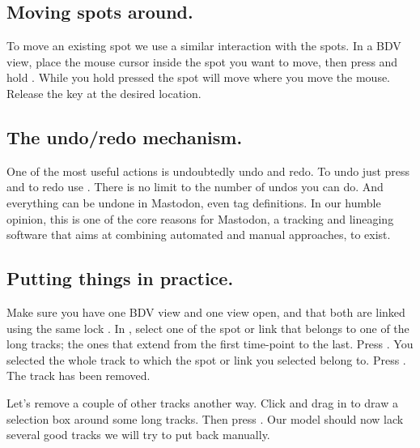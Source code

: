 \subsection{Moving spots around.}

To move an existing spot we use a similar interaction with the spots.
In a BDV view, place the mouse cursor inside the spot you want to move, then press and hold .
While you hold  pressed the spot will move where you move the mouse. 
Release the  key at the desired location.


\subsection{The undo/redo mechanism.}

One of the most useful actions is undoubtedly undo and redo. 
To undo just press  and to redo use . 
There is no limit to the number of undos you can do. 
And everything can be undone in Mastodon, even tag definitions.
In our humble opinion, this is one of the core reasons for Mastodon, a tracking and lineaging software that aims at combining automated and manual approaches, to exist.


\subsection{Putting things in practice.}

Make sure you have one BDV view and one \TrackScheme view open, and that both are linked using the same lock .
In \TrackScheme, select one of the spot or link that belongs to one of the long tracks; the ones that extend from the first time-point to the last.
Press .
You selected the whole track to which the spot or link you selected belong to.
Press \keys{\shift+\backdel}.
The track has been removed.

Let's remove a couple of other tracks another way.
Click and drag in \TrackScheme to draw a selection box around some long tracks.
Then press \keys{\shift+\backdel}.
Our model should now lack several good tracks we will try to put back manually.

